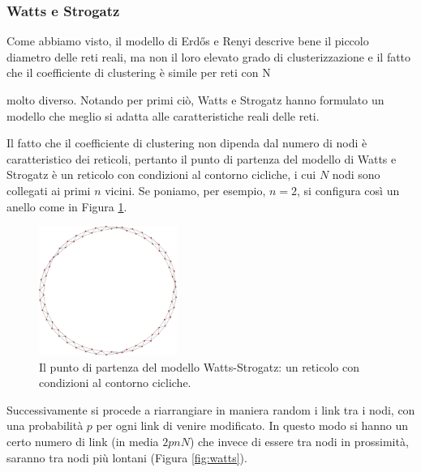 \subsubsection{Watts e Strogatz}
Come abbiamo visto, il modello di Erdős e Renyi descrive bene il piccolo diametro delle reti reali, ma non il loro elevato grado di clusterizzazione e il fatto che il coefficiente di clustering è simile per reti con N

molto diverso. Notando per primi ciò, Watts e Strogatz hanno formulato un modello che meglio si adatta alle caratteristiche reali delle reti.

Il fatto che il coefficiente di clustering non dipenda dal numero di nodi è caratteristico dei reticoli, pertanto il punto di partenza del modello di Watts e Strogatz è un reticolo con condizioni al contorno cicliche, i cui $N$ nodi sono collegati ai primi $n$ vicini. Se poniamo, per esempio, $n = 2$, si configura così un anello come in Figura \ref{fig:ring}.
\clearpage
\begin{figure}[t]
	\centering
	\includegraphics[width=0.4\textwidth]{./Immagini/Teoria/zoomring}
	\caption[Reticolo ciclico.]{Il punto di partenza del modello Watts-Strogatz: un reticolo con condizioni al contorno cicliche.}
	\label{fig:ring}
\end{figure}

Successivamente si procede a riarrangiare in maniera random i link tra i nodi, con una probabilità $p$ per ogni link di venire modificato. In questo modo si hanno un certo numero di link (in media $2pnN$) che invece di essere tra nodi in prossimità, saranno tra nodi più lontani (Figura \ref{fig:watts}).

